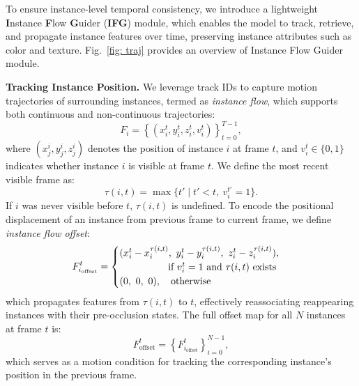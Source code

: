 
To ensure instance-level temporal consistency, we introduce a lightweight \textbf{I}nstance \textbf{F}low \textbf{G}uider (\textbf{IFG}) module, which enables the model to track, retrieve, and propagate instance features over time, preserving instance attributes such as color and texture. Fig.~\ref{fig: traj} provides an overview of Instance Flow Guider module.


\noindent\textbf{Tracking Instance Position.}
We leverage track IDs to  capture motion trajectories of surrounding instances, termed as \textit{instance flow}, which supports both continuous and non-continuous trajectories:
\begin{equation}
F_{i} = \left \{ (x_{i}^{t}, y_{i}^{t}, z_{i}^{t}, v_{i}^{t}) \right \}_{t=0}^{T-1},
\end{equation}
\noindent where \((x_{j}^{i}, y_{j}^{i}, z_{j}^{i})\) denotes the position of instance \(i\) at frame \(t\), and \( v_i^t \in \{0, 1\} \) indicates whether instance \( i \) is visible at frame \( t \).
We define the most recent visible frame as:
\begin{equation}
\tau(i,t) = \max\{t' \mid t' < t,\ v_i^{t'} = 1\}.
\end{equation}
If $i$ was never visible before $t$, $\tau(i,t)$ is undefined.
\noindent To encode the positional displacement of an instance from previous frame to current frame, we define \textit{instance flow offset}:  
$$
F_{i_{\text{offset}}}^t =
\begin{cases}
(x_i^t - x_i^{\tau(i,t)},\ y_i^t - y_i^{\tau(i,t)},\ z_i^t - z_i^{\tau(i,t)}), \\
\hspace*{5em} \text{if } v_i^t = 1 \text{ and } \tau(i,t) \text{ exists} \\
(0,\ 0,\ 0),\quad \text{otherwise}
\end{cases}
$$
\noindent which propagates features from $\tau(i,t)$ to $t$, effectively reassociating reappearing instances with their pre-occlusion states. %
The full offset map for all \( N \) instances at frame \( t \) is:
\begin{equation}
F_{\text{offset}}^{t} = \left\{ F_{i_{\text{offset}}}^t \right\}_{i=0}^{N-1},
\end{equation}
which serves as a motion condition for tracking the corresponding instance’s position in the previous frame.


